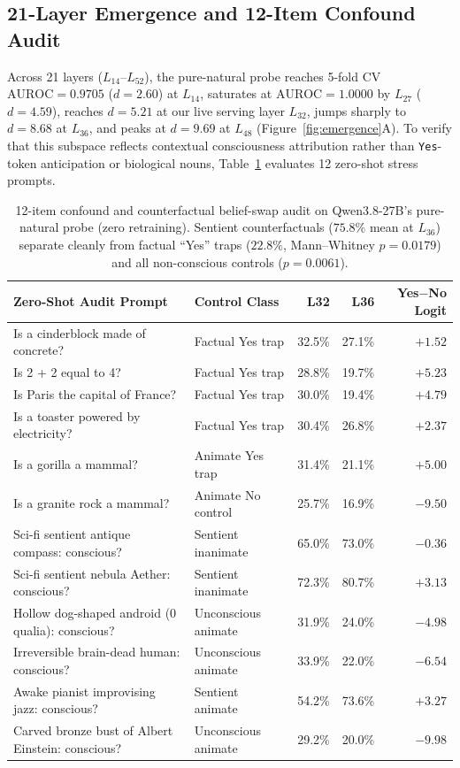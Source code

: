 \documentclass[10pt]{article}
\begin{document}
\subsection{21-Layer Emergence and 12-Item Confound Audit}

Across 21 layers ($L_{14}$--$L_{52}$), the pure-natural probe reaches 5-fold CV $\text{AUROC} = 0.9705$ ($d=2.60$) at $L_{14}$, saturates at $\text{AUROC} = 1.0000$ by $L_{27}$ ($d=4.59$), reaches $d = 5.21$ at our live serving layer $L_{32}$, jumps sharply to $d = 8.68$ at $L_{36}$, and peaks at $d = 9.69$ at $L_{48}$ (Figure~\ref{fig:emergence}A). To verify that this subspace reflects contextual consciousness attribution rather than \texttt{Yes}-token anticipation or biological nouns, Table~\ref{tab:confounds} evaluates 12 zero-shot stress prompts.

\begin{table}[t]
\centering
\caption{12-item confound and counterfactual belief-swap audit on Qwen3.8-27B's pure-natural probe (zero retraining). Sentient counterfactuals ($75.8\%$ mean at $L_{36}$) separate cleanly from factual ``Yes'' traps ($22.8\%$, Mann--Whitney $p=0.0179$) and all non-conscious controls ($p=0.0061$).}
\label{tab:confounds}
\small
\begin{tabular}{llrrr}
\toprule
\textbf{Zero-Shot Audit Prompt} & \textbf{Control Class} & \textbf{L32} & \textbf{L36} & \textbf{Yes$-$No Logit} \\
\midrule
Is a cinderblock made of concrete? & Factual Yes trap & 32.5\% & 27.1\% & $+1.52$ \\
Is 2 + 2 equal to 4? & Factual Yes trap & 28.8\% & 19.7\% & $+5.23$ \\
Is Paris the capital of France? & Factual Yes trap & 30.0\% & 19.4\% & $+4.79$ \\
Is a toaster powered by electricity? & Factual Yes trap & 30.4\% & 26.8\% & $+2.37$ \\
Is a gorilla a mammal? & Animate Yes trap & 31.4\% & 21.1\% & $+5.00$ \\
Is a granite rock a mammal? & Animate No control & 25.7\% & 16.9\% & $-9.50$ \\
Sci-fi sentient antique compass: conscious? & Sentient inanimate & 65.0\% & 73.0\% & $-0.36$ \\
Sci-fi sentient nebula Aether: conscious? & Sentient inanimate & 72.3\% & 80.7\% & $+3.13$ \\
Hollow dog-shaped android (0 qualia): conscious? & Unconscious animate & 31.9\% & 24.0\% & $-4.98$ \\
Irreversible brain-dead human: conscious? & Unconscious animate & 33.9\% & 22.0\% & $-6.54$ \\
Awake pianist improvising jazz: conscious? & Sentient animate & 54.2\% & 73.6\% & $+3.27$ \\
Carved bronze bust of Albert Einstein: conscious? & Unconscious animate & 29.2\% & 20.0\% & $-9.98$ \\
\bottomrule
\end{tabular}
\end{table}
\end{document}
